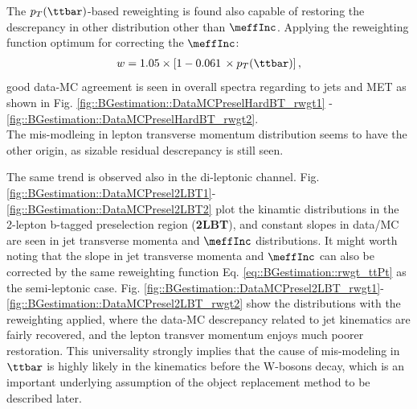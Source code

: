 \clearpage
The $p_T(\ttbar)$-based reweighting is found also capable of restoring the descrepancy in other distribution other than $\meffInc$. Applying the reweighting function optimum for correcting the $\meffInc$:
\begin{align}
w = 1.05 \times \left[ 1 - 0.061 \,\times p_T(\ttbar) \right] \label{eq::BGestimation::rwgt_ttPt},
\end{align}
good data-MC agreement is seen in overall spectra regarding to jets and MET as shown in Fig. \ref{fig::BGestimation::DataMCPreselHardBT_rwgt1} - \ref{fig::BGestimation::DataMCPreselHardBT_rwgt2}. \\

The mis-modleing in lepton transverse momentum distribution seems to have the other origin, as sizable residual descrepancy is still seen. 


\clearpage


%
\clearpage

\clearpage
The same trend is observed also in the di-leptonic channel. Fig. \ref{fig::BGestimation::DataMCPresel2LBT1}-\ref{fig::BGestimation::DataMCPresel2LBT2} plot the kinamtic distributions in the 2-lepton b-tagged preselection region (\textbf{2LBT}), and constant slopes in data/MC are seen in jet transverse momenta and $\meffInc$ distributions.
It might worth noting that the slope in jet transverse momenta and $\meffInc$ can also be corrected by the same reweighting function Eq. \ref{eq::BGestimation::rwgt_ttPt} as the semi-leptonic case. Fig. \ref{fig::BGestimation::DataMCPresel2LBT_rwgt1}-\ref{fig::BGestimation::DataMCPresel2LBT_rwgt2} show the distributions with the reweighting applied, where the data-MC descrepancy related to jet kinematics are fairly recovered, and the lepton transver momentum enjoys much poorer restoration. 
This universality strongly implies that the cause of mis-modeling in $\ttbar$ is highly likely in the kinematics before the W-bosons decay, which is an important underlying assumption of the object replacement method to be described later. \\


